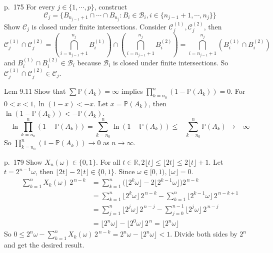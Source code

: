 \begin{note}{p.~175}
    For every $j\in\{1,\cdots,p\}$, construct
    \[
    \mathcal{C}_j=\{B_{n_{j-1}+1}\cap\cdots\cap B_{n_j}: B_i\in\mathcal{B}_i,i\in\{n_{j-1}+1,\cdots,n_j\}\}
    \]
    Show $\mathcal{C}_j$ is closed under finite intersections. Consider $\mathcal{C}_j^{(1)},\mathcal{C}_j^{(2)}$, then
    \[
    \mathcal{C}_j^{(1)}\cap\mathcal{C}_j^{(2)}=\left(
    \bigcap_{i=n_{j-1}+1}^{n_j}B_i^{(1)}
    \right)\cap\left(
    \bigcap_{i=n_{j-1}+1}^{n_j}B_i^{(2)}
    \right)=\bigcap_{i=n_{j-1}+1}^{n_j}(B_i^{(1)}\cap B_i^{(2)})
    \]
    and $B_i^{(1)}\cap B_i^{(2)}\in\mathcal{B}_i$ because $\mathcal{B}_i$ is closed under finite intersections. So $\mathcal{C}_j^{(1)}\cap\mathcal{C}_j^{(2)}\in\mathcal{C}_j$.
\end{note}

\begin{note}{Lem 9.11}
    Show that $\sum\mathbb{P}(A_k)=\infty$ implies $\prod_{k=n_0}^n (1-\mathbb{P}(A_k))=0$. For $0<x<1,\ln(1-x)<-x$. Let $x=\mathbb{P}(A_k)$, then $\ln(1-\mathbb{P}(A_k))<-\mathbb{P}(A_k)$.
    \[
    \ln\prod_{k=n_0}^n (1-\mathbb{P}(A_k))=\sum_{k=n_0}^n\ln(1-\mathbb{P}(A_k))\le -\sum_{k=n_0}^n\mathbb{P}(A_k)\to -\infty
    \]
    So $\prod_{k=n_0}^n(1-\mathbb{P}(A_k))\to 0$ as $n\to\infty$.
\end{note}

\begin{note}{p.~179}
Show $X_n(\omega)\in \{0,1\}.$ For all $t\in\mathbb{R}, 2\lfloor t\rfloor\le\lfloor 2t\rfloor\le 2\lfloor t\rfloor+1$. Let $t=2^{n-1}\omega$, then $\lfloor 2t\rfloor-2\lfloor t\rfloor\in\{0,1\}$. Since $\omega\in[0,1), \lfloor \omega\rfloor=0$.
$$
\begin{aligned}
\sum_{k=1}^n X_k(\omega)\,2^{\,n-k}
&=\sum_{k=1}^n\big(\lfloor 2^k\omega\rfloor-2\lfloor 2^{k-1}\omega\rfloor\big)2^{\,n-k}\\
&=\sum_{k=1}^n\lfloor 2^k\omega\rfloor\,2^{\,n-k}-\sum_{k=1}^n\lfloor 2^{k-1}\omega\rfloor\,2^{\,n-k+1}\\
&=\sum_{j=1}^n\lfloor 2^j\omega\rfloor\,2^{\,n-j}-\sum_{j=0}^{n-1}\lfloor 2^{j}\omega\rfloor\,2^{\,n-j}\\
&=\lfloor 2^n\omega\rfloor-\lfloor 2^0\omega\rfloor\,2^{\,n}
=\lfloor 2^n\omega\rfloor
\end{aligned}
$$
So $0\le 2^n\omega-\sum_{k=1}^n X_k(\omega)\,2^{\,n-k}=2^n\omega-\lfloor 2^n\omega\rfloor<1$. Divide both sides by $2^n$ and get the desired result.
\end{note}

